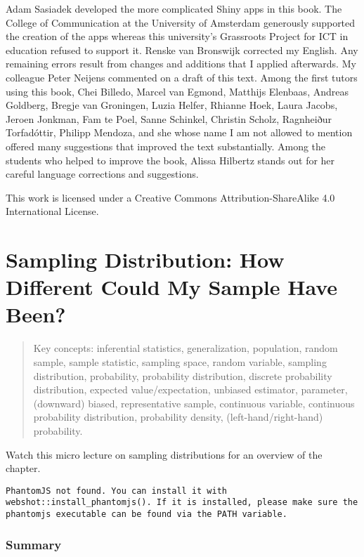 \documentclass[
  letterpaper,
  DIV=11,
  numbers=noendperiod]{scrreprt}
\begin{document}
Adam Sasiadek developed the more complicated Shiny apps in this book.
The College of Communication at the University of Amsterdam generously
supported the creation of the apps whereas this university's Grassroots
Project for ICT in education refused to support it. Renske van Bronswijk
corrected my English. Any remaining errors result from changes and
additions that I applied afterwards. My colleague Peter Neijens
commented on a draft of this text. Among the first tutors using this
book, Chei Billedo, Marcel van Egmond, Matthijs Elenbaas, Andreas
Goldberg, Bregje van Groningen, Luzia Helfer, Rhianne Hoek, Laura
Jacobs, Jeroen Jonkman, Fam te Poel, Sanne Schinkel, Christin Scholz,
Ragnheiður Torfadóttir, Philipp Mendoza, and she whose name I am not
allowed to mention offered many suggestions that improved the text
substantially. Among the students who helped to improve the book, Alissa
Hilbertz stands out for her careful language corrections and
suggestions.

This work is licensed under a Creative Commons Attribution-ShareAlike
4.0 International License.

\part{Sampling Distribution: How Different Could My Sample Have Been?}

\begin{quote}
Key concepts: inferential statistics, generalization, population, random
sample, sample statistic, sampling space, random variable, sampling
distribution, probability, probability distribution, discrete
probability distribution, expected value/expectation, unbiased
estimator, parameter, (downward) biased, representative sample,
continuous variable, continuous probability distribution, probability
density, (left-hand/right-hand) probability.
\end{quote}

Watch this micro lecture on sampling distributions for an overview of
the chapter.

\begin{verbatim}
PhantomJS not found. You can install it with webshot::install_phantomjs(). If it is installed, please make sure the phantomjs executable can be found via the PATH variable.
\end{verbatim}

\hypertarget{summary}{%
\section*{Summary}\label{summary}}
\end{document}
